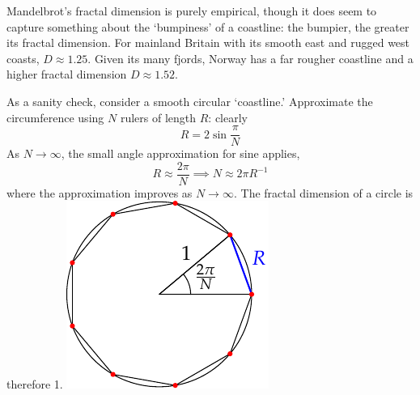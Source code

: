 Mandelbrot's fractal dimension is purely empirical, though it does seem to capture something about the `bumpiness' of a coastline: the bumpier, the greater its fractal dimension. For mainland Britain with its smooth east and rugged west coasts, $D\approx 1.25$. Given its many fjords, Norway has a far rougher coastline and a higher fractal dimension $D\approx 1.52$.

\begin{example}[lower separated=false, sidebyside, sidebyside align=top seam, sidebyside gap=0pt, righthand width=0.29\linewidth]{}{}
	As a sanity check, consider a smooth circular `coastline.' Approximate the circumference using $N$ rulers of length $R$: clearly
	\[
		R=2\sin\frac\pi N
	\]
	As $N\to\infty$, the small angle approximation for sine applies,
	\[
		R\approx \frac{2\pi}N\implies N\approx 2\pi R^{-1}
	\]
	where the approximation improves as $N\to\infty$. The fractal dimension of a circle is therefore 1.
	\tcblower
	\flushright\includegraphics{self-sim-circle}
\end{example}
\goodbreak


